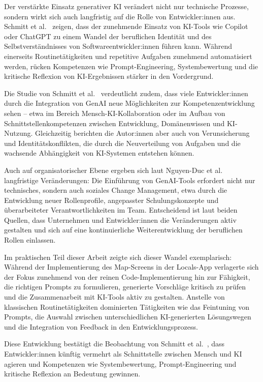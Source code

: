 Der verstärkte Einsatz generativer KI verändert nicht nur technische Prozesse,
sondern wirkt sich auch langfristig auf die Rolle von Entwickler:innen aus.
Schmitt et al.~\cite{schmitt_generative_2024} zeigen, dass der zunehmende
Einsatz von KI-Tools wie Copilot oder ChatGPT zu einem Wandel der beruflichen
Identität und des Selbstverständnisses von Softwareentwickler:innen führen
kann. Während einerseits Routinetätigkeiten und repetitive Aufgaben zunehmend
automatisiert werden, rücken Kompetenzen wie Prompt-Engineering,
Systembewertung und die kritische Reflexion von KI-Ergebnissen stärker in den
Vordergrund.

Die Studie von Schmitt et al.~\cite{schmitt_generative_2024} verdeutlicht
zudem, dass viele Entwickler:innen durch die Integration von GenAI neue
Möglichkeiten zur Kompetenzentwicklung sehen -- etwa im Bereich
Mensch-KI-Kollaboration oder im Aufbau von Schnittstellenkompetenzen zwischen
Entwicklung, Domänenwissen und KI-Nutzung. Gleichzeitig berichten die
Autor:innen aber auch von Verunsicherung und Identitätskonflikten, die durch
die Neuverteilung von Aufgaben und die wachsende Abhängigkeit von KI-Systemen
entstehen können.

Auch auf organisatorischer Ebene ergeben sich laut Nguyen-Duc et
al.~\cite{nguyen-duc_generative_2023} langfristige Veränderungen: Die
Einführung von GenAI-Tools erfordert nicht nur technisches, sondern auch
soziales Change Management, etwa durch die Entwicklung neuer Rollenprofile,
angepasster Schulungskonzepte und überarbeiteter Verantwortlichkeiten im Team.
Entscheidend ist laut beiden Quellen, dass Unternehmen und Entwickler:innen die
Veränderungen aktiv gestalten und sich auf eine kontinuierliche
Weiterentwicklung der beruflichen Rollen einlassen.

Im praktischen Teil dieser Arbeit zeigte sich dieser Wandel exemplarisch:
Während der Implementierung des Map-Screens in der Locals-App verlagerte sich
der Fokus zunehmend von der reinen Code-Implementierung hin zur Fähigkeit, die
richtigen Prompts zu formulieren, generierte Vorschläge kritisch zu prüfen und
die Zusammenarbeit mit KI-Tools aktiv zu gestalten. Anstelle von klassischen
Routinetätigkeiten dominierten Tätigkeiten wie das Feintuning von Prompts, die
Auswahl zwischen unterschiedlichen KI-generierten Lösungswegen und die
Integration von Feedback in den Entwicklungsprozess.

Diese Entwicklung bestätigt die Beobachtung von Schmitt et
al.~\cite{schmitt_generative_2024}, dass Entwickler:innen künftig vermehrt als
Schnittstelle zwischen Mensch und KI agieren und Kompetenzen wie
Systembewertung, Prompt-Engineering und kritische Reflexion an Bedeutung
gewinnen.

